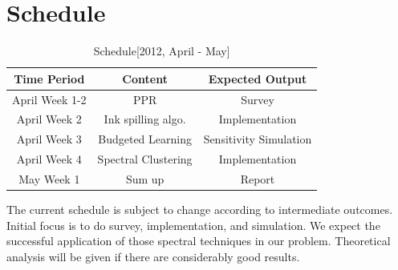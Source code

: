 \documentclass[11pt,a4paper]{article}
\begin{document}
\section{Schedule}

\begin{table}[htb]
	\centering
	\caption{Schedule[2012, April - May]}
	\begin{tabular}{|c|c|c|}
	\hline
	Time Period & Content & Expected Output \\
	\hline
	April Week 1-2 & PPR & Survey \\
	April Week 2 & Ink spilling algo. & Implementation \\
	April Week 3 & Budgeted Learning & Sensitivity Simulation \\
	April Week 4 & Spectral Clustering & Implementation\\
	May Week 1 & Sum up & Report \\
	\hline
	\end{tabular}
\end{table}

The current schedule is subject to change according to intermediate outcomes. 
Initial focus is to do survey, implementation, and simulation. 
We expect the successful application of those spectral techniques
in our problem. Theoretical 
analysis will be given if there are considerably good results. 



\end{document}
